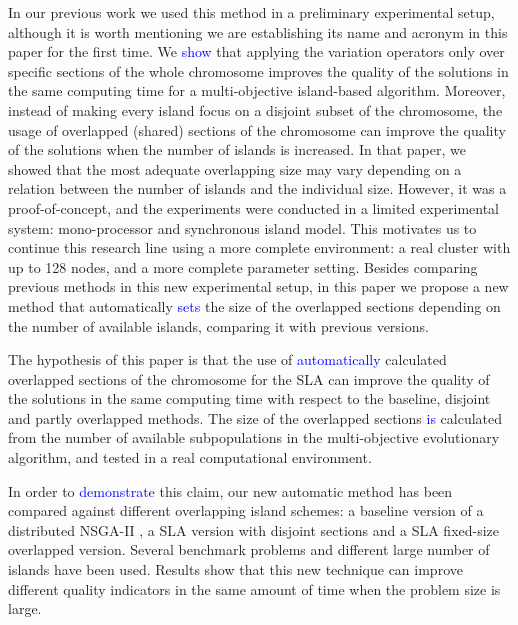 \documentclass[preprint]{elsarticle}
\begin{document}
In our previous work \citep{Garcia16hpmoon} we used this method in a
preliminary experimental setup, although it is worth mentioning we are
establishing its name and acronym in this paper for the first time.
We \textcolor{blue}{show}
that applying the variation operators only over specific sections of the whole chromosome improves the quality of the solutions in the same computing time for a multi-objective island-based algorithm.
Moreover, instead of making every island focus on a disjoint subset of the
chromosome, the usage of overlapped (shared) sections of the
chromosome 
can improve the quality of the solutions 
when the number of islands is increased. In that paper, we showed that the most
adequate overlapping size may vary depending on a relation between the
number of islands and the individual size. However, it was a proof-of-concept, and the experiments
were conducted in a limited experimental system: mono-processor and
synchronous island model. 
This
motivates us to continue this research line using a more complete environment: a real cluster with up to 128 nodes, and a more complete parameter setting. Besides comparing previous methods in this new experimental setup, in this paper we propose
a new method that automatically \textcolor{blue}{sets} the size of the overlapped
sections depending on the number of available islands, comparing it with previous versions. 





The hypothesis of this paper is that the use of \textcolor{blue}{automatically} calculated overlapped sections of the
chromosome for the SLA can improve the
quality of the solutions in the same computing time with respect to
the baseline, disjoint and partly overlapped methods. 
The size of the overlapped sections \textcolor{blue}{is} calculated from  the number of available subpopulations in the multi-objective evolutionary algorithm, and tested in a real computational environment.


In order to \textcolor{blue}{demonstrate} this claim, our new automatic method has been
compared against different overlapping island schemes: a
baseline version of a distributed NSGA-II \citep{Deb00NSGAII}, a
SLA version with disjoint sections and a SLA
fixed-size overlapped version. 
Several benchmark problems and different large number of islands
have been used. Results show that this new technique can improve
different quality indicators in the same amount of time when the
problem size is large.  
\end{document}
